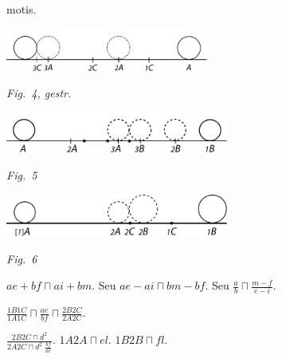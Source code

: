 %
motis.
\pend
%
\vspace{2.0em}
\centerline{\includegraphics[width=0.5\textwidth]{gesamttex/edit_VIII,3/images/LH_37_05_150-151_d4_151v.pdf}} 
\vspace{0.5em}
\centerline{\lbrack\textit{Fig.~4, gestr.}\rbrack}
 \newpage%
% 
\centerline{\includegraphics[width=0.55\textwidth]{gesamttex/edit_VIII,3/images/LH_37_05_150-151_d5_151v.pdf}}
\vspace{0.5em}
\centerline{\lbrack\textit{Fig.~5}\rbrack}
\vspace{2.5em}
%
\centerline{\includegraphics[width=0.55\textwidth]{gesamttex/edit_VIII,3/images/LH_37_05_150-151_d6_151v.pdf}}
\vspace{0.5em}
\centerline{\lbrack\textit{Fig.~6}\rbrack}
\vspace{1.5em}
%
\pstart
{}
$ae+bf \sqcap ai+bm$. Seu $ae-ai \sqcap bm-bf$. Seu $\displaystyle\frac{a}{b} \sqcap \displaystyle\frac{m-f}{e-i}$.
\pend\pstart
\rule[0cm]{0mm}{16pt}$\displaystyle\frac{{\scriptstyle \textit{1}}B{\scriptstyle \textit{1}}C}{{\scriptstyle \textit{1}}A{\scriptstyle \textit{1}}C} \sqcap \displaystyle\frac{ae}{bf} \sqcap \displaystyle\frac{{\scriptstyle \textit{2}}B{\scriptstyle \textit{2}}C}{{\scriptstyle \textit{2}}A{\scriptstyle \textit{2}}C}.$
%
\pend\pstart
\rule[0cm]{0mm}{18pt}$\displaystyle\frac{{\scriptstyle \textit{2}}B{\scriptstyle \textit{2}}C \sqcap d^2}{{\scriptstyle \textit{2}}A{\scriptstyle \textit{2}}C \sqcap d^2\; \displaystyle\frac{bf}{ae}}$. ${\scriptstyle \textit{1}}A{\scriptstyle \textit{2}}A \sqcap el$. ${\scriptstyle \textit{1}}B{\scriptstyle \textit{2}}B \sqcap fl$. 

